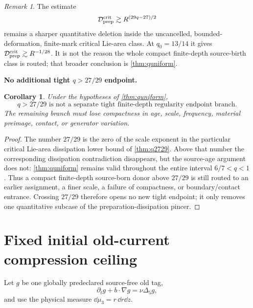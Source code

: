 \documentclass[11pt]{article}
\newtheorem{corollary}[theorem]{Corollary}
\theoremstyle{definition}\newtheorem{definition}[theorem]{Definition}
\theoremstyle{remark}\newtheorem{remark}[theorem]{Remark}
\begin{document}
\begin{remark}
The estimate
\[
 \mathcal D_{\rm prep}^{\rm crit}
 \gtrsim R^{(29q-27)/2}
\]
remains a sharper quantitative deletion inside the uncancelled,
bounded-deformation, finite-mark critical Lie-area class.  At $q_0=13/14$ it
gives $\mathcal D_{\rm prep}^{\rm crit}\gtrsim R^{-1/28}$.  It is not the
reason the whole compact finite-depth source-birth class is routed; that
broader conclusion is \cref{thm:quniform}.
\end{remark}

\medskip
\noindent\textbf{No additional tight $q>27/29$ endpoint.}
\begin{corollary}
Under the hypotheses of \cref{thm:quniform},
\[
\boxed{
q>27/29
\text{ is not a separate tight finite-depth regularity endpoint branch.}
}
\]
The remaining branch must lose compactness in age, scale, frequency, material
preimage, contact, or generator variation.
\end{corollary}
\begin{proof}
The number $27/29$ is the zero of the scale exponent in the particular
critical Lie-area dissipation lower bound of \cref{thm:q2729}.  Above that
number the corresponding dissipation contradiction disappears, but the
source-age argument does not: \cref{thm:quniform} remains valid throughout the
entire interval $6/7<q<1$.  Thus a compact finite-depth source-born donor above
$27/29$ is still routed to an earlier assignment, a finer scale, a failure of
compactness, or boundary/contact entrance.  Crossing $27/29$ therefore opens
no new tight endpoint; it only removes one quantitative subcase of the
preparation-dissipation pincer.
\end{proof}

\section{Fixed initial old-current compression ceiling}
Let $g$ be one globally predeclared source-free old tag,
\[
\partial_tg+b\cdot\nabla g=\nu\Delta_5g,
\]
and use the physical measure $\dd\mu_3=r\,\dd r\dd z$.
\end{document}
